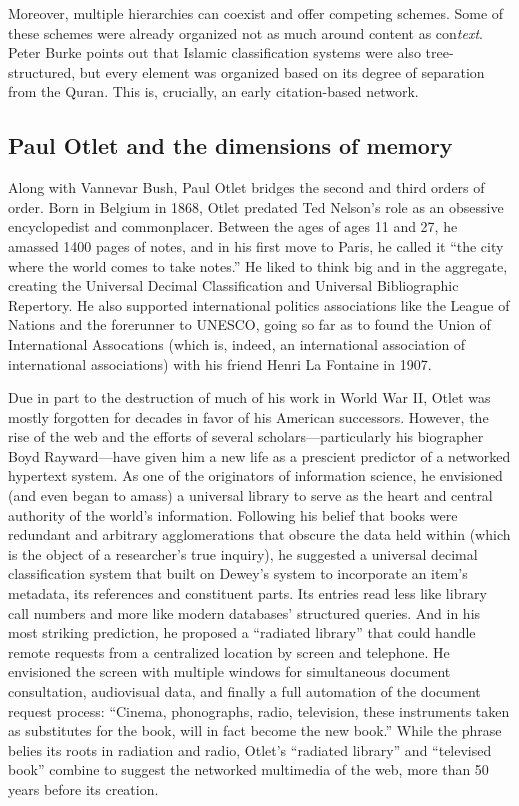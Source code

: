 Moreover, multiple hierarchies can coexist and offer competing schemes. Some of these schemes were already organized not as much around content as con\emph{text}. Peter Burke points out that Islamic classification systems were also tree-structured, but every element was organized based on its degree of separation from the Quran.\autocite[94]{burke_social_2000} This is, crucially, an early citation-based network.

\subsection{Paul Otlet and the dimensions of memory}

Along with Vannevar Bush, Paul Otlet bridges the second and third orders of order. Born in Belgium in 1868, Otlet predated Ted Nelson's role as an obsessive encyclopedist and commonplacer. Between the ages of ages 11 and 27, he amassed 1400 pages of notes, and in his first move to Paris, he called it ``the city where the world comes to take notes.''\autocite{_limited_2001}  He liked to think big and in the aggregate, creating the Universal Decimal Classification and Universal Bibliographic Repertory. He also supported international politics associations like the League of Nations and the forerunner to UNESCO, going so far as to found the Union of International Assocations (which is, indeed, an international association of international associations) with his friend Henri La Fontaine in 1907.

Due in part to the destruction of much of his work in World War II, Otlet was mostly forgotten for decades in favor of his American successors. However, the rise of the web and the efforts of several scholars---particularly his biographer Boyd Rayward---have given him a new life as a prescient predictor of a networked hypertext system. As one of the originators of information science, he envisioned (and even began to amass) a universal library to serve as the heart and central authority of the world's information. Following his belief that books were redundant and arbitrary agglomerations that obscure the data held within (which is the object of a researcher's true inquiry), he suggested a universal decimal classification system that built on Dewey's system to incorporate an item's metadata, its references and constituent parts. Its entries read less like library call numbers and more like modern databases' structured queries. And in his most striking prediction, he proposed a ``radiated library'' that could handle remote requests from a centralized location by screen and telephone. He envisioned the screen with multiple windows for simultaneous document consultation, audiovisual data, and finally a full automation of the document request process: ``Cinema, phonographs, radio, television, these instruments taken as substitutes for the book, will in fact become the new book.''\autocite{van_veelen_alle_1998} While the phrase belies its roots in radiation and radio, Otlet's ``radiated library'' and ``televised book'' combine to suggest the networked multimedia of the web, more than 50 years before its creation.

